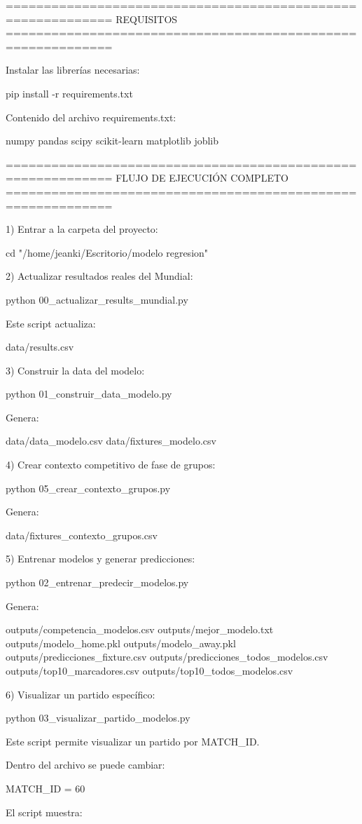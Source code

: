 ============================================================
REQUISITOS
============================================================

Instalar las librerías necesarias:

pip install -r requirements.txt

Contenido del archivo requirements.txt:

numpy
pandas
scipy
scikit-learn
matplotlib
joblib

============================================================
FLUJO DE EJECUCIÓN COMPLETO
============================================================

1) Entrar a la carpeta del proyecto:

cd "/home/jeanki/Escritorio/modelo regresion"

2) Actualizar resultados reales del Mundial:

python 00_actualizar_results_mundial.py

Este script actualiza:

data/results.csv

3) Construir la data del modelo:

python 01_construir_data_modelo.py

Genera:

data/data_modelo.csv
data/fixtures_modelo.csv

4) Crear contexto competitivo de fase de grupos:

python 05_crear_contexto_grupos.py

Genera:

data/fixtures_contexto_grupos.csv

5) Entrenar modelos y generar predicciones:

python 02_entrenar_predecir_modelos.py

Genera:

outputs/competencia_modelos.csv
outputs/mejor_modelo.txt
outputs/modelo_home.pkl
outputs/modelo_away.pkl
outputs/predicciones_fixture.csv
outputs/predicciones_todos_modelos.csv
outputs/top10_marcadores.csv
outputs/top10_todos_modelos.csv

6) Visualizar un partido específico:

python 03_visualizar_partido_modelos.py

Este script permite visualizar un partido por MATCH_ID.

Dentro del archivo se puede cambiar:

MATCH_ID = 60

El script muestra:

